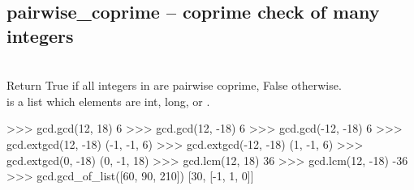   \subsection{pairwise\_coprime -- coprime check of many integers}
   \\
   \spacing
   \quad Return True if all integers in  are pairwise coprime, False otherwise.\\
   \spacing
   \quad {} is a list which elements are int, long, or .\\
%
\begin{ex}
>>> gcd.gcd(12, 18)
6
>>> gcd.gcd(12, -18)
6
>>> gcd.gcd(-12, -18)
6
>>> gcd.extgcd(12, -18)
(-1, -1, 6)
>>> gcd.extgcd(-12, -18)
(1, -1, 6)
>>> gcd.extgcd(0, -18)
(0, -1, 18)
>>> gcd.lcm(12, 18)
36
>>> gcd.lcm(12, -18)
-36
>>> gcd.gcd_of_list([60, 90, 210])
[30, [-1, 1, 0]]
\end{ex}%
\C



